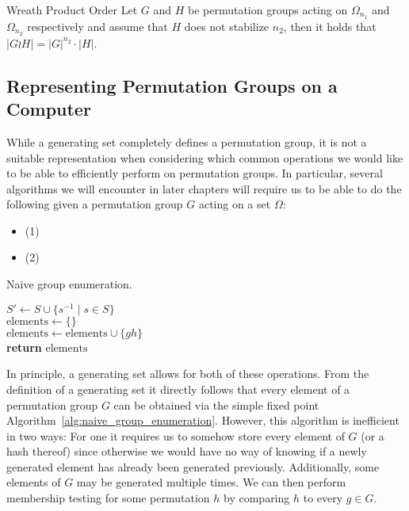 \begin{thm}{Wreath Product Order}
  Let $G$ and $H$ be permutation groups acting on $\Omega_{n_1}$ and
  $\Omega_{n_2}$ respectively and assume that $H$ does not stabilize $n_2$,
  then it holds that $|G \wr H| = |G|^{n_2} \cdot |H|$.
\end{thm}

\subsection{Representing Permutation Groups on a Computer}
\label{subsec:pg_representing_permutation_groups_on_a_computer}

While a generating set completely defines a permutation group, it is not a
suitable representation when considering which common operations we would like
to be able to efficiently perform on permutation groups. In particular,
several algorithms we will encounter in later chapters will require us to be
able to do the following given a permutation group $G$ acting on a set $\Omega$:

\begin{itemize}
  \item {} (1)
  \item {} (2)
\end{itemize}

\begin{algorithm}
  \caption{Naive group enumeration.}
  \label{alg:naive_group_enumeration}
  \begin{algorithmic}[1]
       \State $S' \gets S \cup \{s^{-1} \mid s \in S\}$
       \\
       \State $\mathrm{elements} \gets \{\}$
       \\
            \State $\mathrm{elements} \gets \mathrm{elements} \cup \{gh\}$
          \EndFor
       \EndWhile
       \\
       \State \textbf{return} $\mathrm{elements}$
    \EndProcedure
  \end{algorithmic}
\end{algorithm}

\noindent
In principle, a generating set allows for both of these operations. From the
definition of a generating set it directly follows that every element of a
permutation group $G$ can be obtained via the simple fixed point
Algorithm~\ref{alg:naive_group_enumeration}. However, this algorithm is
inefficient in two ways: For one it requires us to somehow store every element
of $G$ (or a hash thereof) since otherwise we would have no way of knowing if a
newly generated element has already been generated previously. Additionally,
some elements of $G$ may be generated multiple times. We can then perform
membership testing for some permutation $h$ by comparing $h$ to every $g \in G$.

